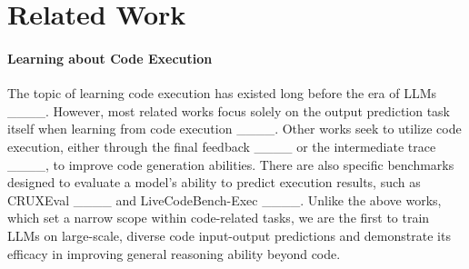 \section{Related Work}
\label{sec:related_work}

\paragraph{Learning about Code Execution}
The topic of learning code execution has existed long before the era of LLMs ____. However, most related works focus solely on the output prediction task itself when learning from code execution ____. Other works seek to utilize code execution, either through the final feedback ____ or the intermediate trace ____, to improve code generation abilities. There are also specific benchmarks designed to evaluate a model's ability to predict execution results, such as CRUXEval ____ and LiveCodeBench-Exec ____. Unlike the above works, which set a narrow scope within code-related tasks, we are the first to train LLMs on large-scale, diverse code input-output predictions and demonstrate its efficacy in improving general reasoning ability beyond code.

